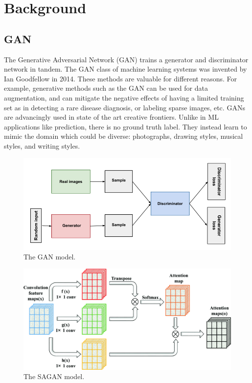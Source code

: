 \documentclass[10pt,twocolumn,letterpaper]{article}
\begin{document}
\section{Background}

\subsection{GAN}

The Generative Adversarial Network (GAN) trains a generator and discriminator
network in tandem. The GAN class of machine learning systems was invented by
Ian Goodfellow in 2014. These methods are valuable for different reasons. For example,
generative methods such as the GAN can be used for data augmentation, 
and can mitigate the negative effects of having a limited training set
as in detecting a rare disease diagnosis, or labeling sparse images, etc.
GANs are advancingly used in state of the art creative frontiers. Unlike in
ML applications like prediction, there is no ground truth label. They
instead learn to mimic the domain which could be diverse: photographs,
drawing styles, musical styles, and writing styles. \cite{Authors14}

\begin{figure}
  \includegraphics[width=1.0\linewidth]{images/gan.png}
  \caption{The GAN model.}
  \label{fig:gan}
\end{figure}

\begin{figure}
  \includegraphics[width=1.0\linewidth]{images/sagan.png}
  \caption{The SAGAN model.}
  \label{fig:sagan}
\end{figure}
\end{document}
